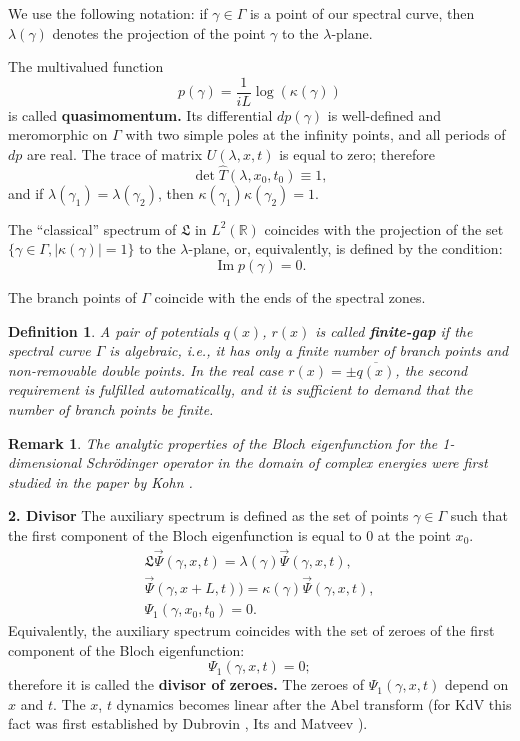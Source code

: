 \documentclass[12pt]{article}
\newcommand{\RR}{\mathbb R}
\newcommand{\LG}{\mathfrak L}
\renewcommand{\Im}{\mathop{\mathrm{Im}}}
\newtheorem{remark}{Remark}
\newtheorem{definition}{Definition}
\begin{document}
We use the following notation: if $\gamma\in\Gamma$ is a point of our spectral curve, then $\lambda(\gamma)$ denotes the projection of the point $\gamma$ to the $\lambda$-plane. 

The multivalued function 
\begin{equation}
\label{eq:bloch2}
p(\gamma)=\frac{1}{iL}\log(\kappa(\gamma))
\end{equation}
is called \textbf{quasimomentum.} Its differential $dp(\gamma)$ is well-defined and meromorphic on $\Gamma$ with two simple poles at the infinity points, and all periods of $dp$ are real. The trace of matrix $U(\lambda,x,t)$ is equal to zero; therefore 
$$
\det \hat T(\lambda,x_0,t_0) \equiv 1, 
$$
and if $\lambda(\gamma_1)=\lambda(\gamma_2)$, then $\kappa(\gamma_1)\kappa(\gamma_2)=1$.

The ``classical'' spectrum of $\LG$ in $L^2(\RR)$ coincides with the projection of the set $\{\gamma\in\Gamma, |\kappa(\gamma)|=1\}$ to the $\lambda$-plane, or, equivalently, is defined by the condition:
$$
\Im p(\gamma)=0.
$$

The branch points of $\Gamma$ coincide with the ends of the spectral zones.

\begin{definition}
A pair of potentials $q(x)$, $r(x)$ is called \textbf{finite-gap} if the spectral curve $\Gamma$ is algebraic, i.e., it has only a finite number of branch points and non-removable double points. In the real case $r(x)=\pm\overline{q(x)}$, the second requirement is fulfilled automatically, and it is sufficient to demand that the number of branch points be finite. 
\end{definition}

\begin{remark}
The analytic properties of the Bloch eigenfunction for the 1-dimensional Schr\"odinger operator in the domain of complex energies were first studied in the paper by  Kohn \cite{Kohn}.
\end{remark}


\textbf{2. Divisor}  The auxiliary spectrum is defined as the set of points $\gamma\in\Gamma$ such 
that the first component of the Bloch eigenfunction is equal to 0 at the point $x_0$.
\begin{eqnarray}
\label{eq:dir1}
\LG\vec\Psi(\gamma,x,t)= \lambda(\gamma) \vec\Psi(\gamma,x,t),\nonumber\\
\vec\Psi(\gamma,x+L,t))=\kappa(\gamma) \vec\Psi(\gamma,x,t),\\
\Psi_1(\gamma,x_0,t_0)=0.\nonumber
\end{eqnarray}
Equivalently, the auxiliary spectrum coincides with the set of zeroes of the first component of the Bloch 
eigenfunction:
\begin{equation}
\label{eq:dir2}
\Psi_1(\gamma,x,t)=0;
\end{equation}
therefore it is called the \textbf{divisor of zeroes.} The zeroes of $\Psi_1(\gamma,x,t)$ depend on $x$ and $t$. The $x$, 
$t$ dynamics becomes linear after the Abel transform (for KdV this fact was first established by Dubrovin \cite{Dubrovin}, Its and Matveev \cite{ItsMatveev}). 
\end{document}
